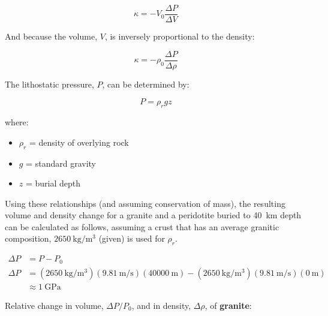 \documentclass{template}
\begin{document}
\begin{enumerate}[label=\textbf{\arabic*.}]
\begin{enumerate}[label=\Alph*)]
{    \begin{equation}
        \kappa = -V_0\frac{\Delta P}{\Delta V}
    \end{equation}

    And because the volume, $V$, is inversely proportional to the density:

    \begin{equation}
        \kappa = -\rho_0\frac{\Delta P}{\Delta\rho}
    \end{equation}

    The lithostatic pressure, $P$, can be determined by:

    \begin{equation}
        P = \rho_r g z
    \end{equation}

    where:

    \begin{itemize}
        \item $\rho_r$ = density of overlying rock
        \item $g$ = standard gravity
        \item $z$ = burial depth
    \end{itemize}

    Using these relationships (and assuming conservation of mass), the resulting volume and density change for a granite and a peridotite buried to 40~km depth can be calculated as follows, assuming a crust that has an average granitic composition, $\qty{2650}{\kg\per\m\cubed}$ (given) is used for $\rho_r$.

    \begin{align*}
        \Delta P &= P - P_0\\
        \Delta P &= (\qty{2650}{\kg\per\m\cubed})(\qty{9.81}{\m\per\s})(\qty{40000}{\m}) - (\qty{2650}{\kg\per\m\cubed})(\qty{9.81}{\m\per\s})(\qty{0}{\m})\\
        &\approx \qty{1}{\giga\Pa}
    \end{align*}

    Relative change in volume, $\Delta P/P_0$, and in density, $\Delta\rho$, of \textbf{granite}:

}
\end{enumerate}
\end{enumerate}
\end{document}
